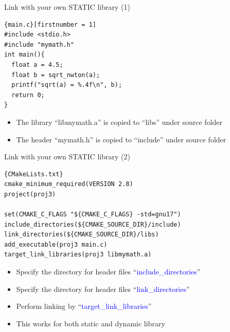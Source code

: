 \begin{frame}[fragile]{Link with your own STATIC library (1)}
\vspace{-0.15in}
\begin{lstlisting}{main.c}[firstnumber = 1]
#include <stdio.h>
#include "mymath.h"
int main(){
  float a = 4.5;
  float b = sqrt_nwton(a);
  printf("sqrt(a) = %.4f\n", b);
  return 0;
}
\end{lstlisting}
\begin{itemize}
	\item {The library ``libmymath.a'' is copied to ``libs'' under source folder}
	\item {The header ``mymath.h'' is copied to ``include'' under source folder}
\end{itemize}
\end{frame}

\begin{frame}[fragile]{Link with your own STATIC library (2)}
\begin{lstlisting}[linewidth=0.95\linewidth, firstnumber= 1, xleftmargin=0.02\linewidth]{CMakeLists.txt}
cmake_minimum_required(VERSION 2.8)
project(proj3)

set(CMAKE_C_FLAGS "${CMAKE_C_FLAGS} -std=gnu17")
include_directories(${CMAKE_SOURCE_DIR}/include)
link_directories(${CMAKE_SOURCE_DIR}/libs)
add_executable(proj3 main.c)
target_link_libraries(proj3 libmymath.a)

\end{lstlisting}

\begin{itemize}
	\item {Specify the directory for header files ``\textcolor{blue}{include\_directories}''}
	\item {Specify the directory for header files ``\textcolor{blue}{link\_directories}''}
	\item {Perform linking by ``\textcolor{blue}{target\_link\_libraries}''}
	\item {This works for both static and dynamic library}
\end{itemize}
\end{frame}